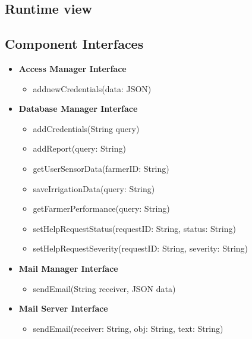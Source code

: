 \documentclass[10pt]{article} %
\begin{document}
\subsection{Runtime view}
\subsection{Component Interfaces}
\begin{itemize}
    \item \textbf{Access Manager Interface}
        \begin{itemize}
            \item addnewCredentials(data: JSON)
        \end{itemize}

    \item \textbf{Database Manager Interface}
    \begin{itemize}
        \item addCredentials(String query)
        \item addReport(query: String)
        \item getUserSensorData(farmerID: String)
        \item saveIrrigationData(query: String)
        \item getFarmerPerformance(query: String)
        \item setHelpRequestStatus(requestID: String, status: String)
        \item setHelpRequestSeverity(requestID: String, severity: String)
    \end{itemize}

    \item \textbf{Mail Manager Interface}
        \begin{itemize}
           \item sendEmail(String receiver, JSON data)
        \end{itemize}

    \item \textbf{Mail Server Interface}
        \begin{itemize}
            \item sendEmail(receiver: String, obj: String, text: String)
        \end{itemize}
    

\end{itemize}
\end{document}
